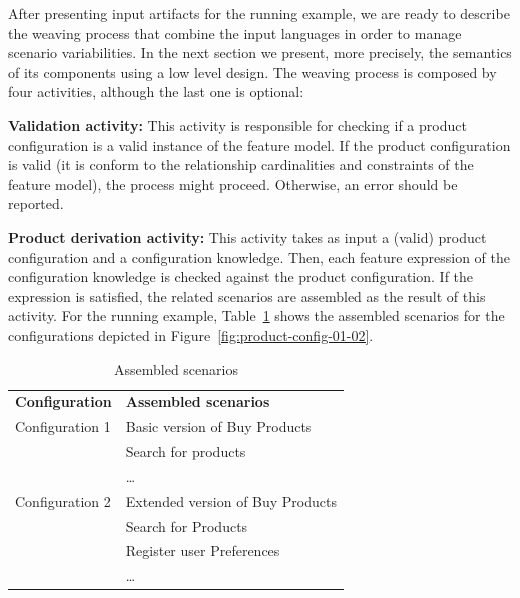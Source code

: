 \documentclass{acm_proc_article-sp}
\begin{document}
After presenting input artifacts for the running example, we are ready to describe the weaving process that combine 
the input languages in order to manage scenario variabilities. In the next section we present, more precisely, the semantics of its components using a low level design. The weaving process is composed by four activities, although the last one is optional:

{\bf Validation activity:} This activity is responsible for checking if a product configuration is a valid instance of the feature model. If the product configuration is 
valid (it is conform to the relationship cardinalities and constraints of the feature model), the process might proceed. Otherwise, an error should be reported. 

{\bf Product derivation activity:} This activity takes as input a (valid) product configuration and a configuration knowledge. 
Then, each feature expression of the configuration knowledge is checked against the product configuration. If the expression 
is satisfied, the related scenarios are assembled as the result of this activity. For the running example, 
Table~\ref{tab:assembled-scenarios} shows the assembled scenarios for the configurations depicted in Figure~\ref{fig:product-config-01-02}.

\begin{table}[h]
\begin{center}
\caption{Assembled scenarios} \label{tab:assembled-scenarios}
\begin{tabular}{ll}
   \hline\noalign{\smallskip}
  {\bf Configuration} & {\bf Assembled scenarios} \\
   \noalign{\smallskip}
   \hline
   \noalign{\smallskip}
    Configuration 1\hspace{15pt} & Basic version of Buy Products \\
                             & Search for products \\
                             & \ldots \\
   Configuration 2 & Extended version of Buy Products \\
                             & Search for Products	 \\
                             & Register user Preferences \\
                             & \ldots       \\
  \hline
\end{tabular}
\end{center}
\end{table}
 
\end{document}
